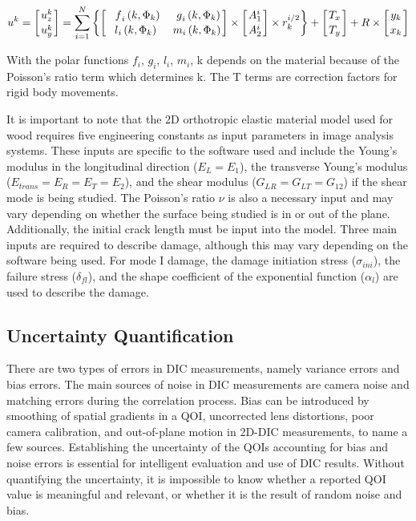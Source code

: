 \begin{equation}
	u^k=\left[{u_z^k\atop u_y^k}\right]=\sum_{i=1}^{N}\left\{\left[{{\ \ f}_i\left(k,\Phi_k\right)\ \ {\ \ g}_i\left(k,\Phi_k\right)\atop{\ \ l}_i\left(k,\Phi_k\right)\ \ {\ \ m}_i\left(k,\Phi_k\right)}\right]\times\left[{A_1^i\atop A_2^i}\right] \times r_k^{i/2}\right\}+\left[{T_x\atop T_y}\right]+R\times\left[{y_k\atop x_k}\right] 
	\label{3}
\end{equation}

With the polar functions $f_i$, $g_i$, $l_i$, $m_i$, k depends on the material because of the Poisson's ratio term which determines k. The T terms are correction factors for rigid body movements.

It is important to note that the 2D orthotropic elastic material model used for wood requires five engineering constants as input parameters in image analysis systems. These inputs are specific to the software used and include the Young's modulus in the longitudinal direction ($E_L=E_1$), the transverse Young's modulus ($E_{trans}=E_R=E_T=E_2$), and the shear modulus ($G_{LR}=G_{LT}=G_{12}$) if the shear mode is being studied.
The Poisson's ratio $\nu$ is also a necessary input and may vary depending on whether the surface being studied is in or out of the plane. Additionally, the initial crack length must be input into the model.
Three main inputs are required to describe damage, although this may vary depending on the software being used. For mode I damage, the damage initiation stress ($\sigma_{ini}$), the failure stress ($\delta_{fl}$), and the shape coefficient of the exponential function ($\alpha_l$) are used to describe the damage.

\subsection{Uncertainty Quantification}

There are two types of errors in DIC measurements, namely variance errors and bias errors. The main sources of noise in DIC measurements are camera noise and matching errors during the correlation process. Bias can be introduced by smoothing of spatial gradients in a QOI, uncorrected lens distortions, poor camera calibration, and out-of-plane motion in 2D-DIC measurements, to name a few sources. Establishing the uncertainty of the QOIs accounting for bias and noise errors is essential for intelligent evaluation and use of DIC results. Without quantifying the uncertainty, it is impossible to know whether a reported QOI value is meaningful and relevant, or whether it is the result of random noise and bias.

